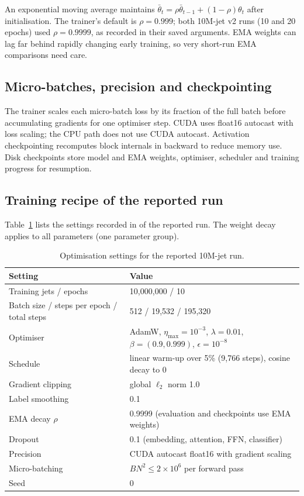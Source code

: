 \documentclass[11pt,a4paper]{article}
\newcommand{\code}[1]{\texttt{\small\detokenize{#1}}}
\numberwithin{equation}{section}
\begin{document}
An exponential moving average maintains
$\bar\theta_t=\rho\bar\theta_{t-1}+(1-\rho)\theta_t$ after initialisation.
The trainer's default is $\rho=0.999$; both 10M-jet v2 runs (10 and 20 epochs) used
$\rho=0.9999$, as recorded in their saved arguments. EMA weights can lag far behind rapidly
changing early training, so very short-run EMA comparisons need care.

\subsection{Micro-batches, precision and checkpointing}
The trainer scales each micro-batch loss by its fraction of the full
batch before accumulating gradients for one optimiser step. CUDA uses
float16 autocast with loss scaling; the CPU path does not use CUDA
autocast. Activation checkpointing recomputes block internals in
backward to reduce memory use. Disk checkpoints store model and EMA
weights, optimiser, scheduler and training progress for resumption.

\subsection{Training recipe of the reported run}
Table~\ref{tab:hyper} lists the settings recorded in \code{results.json} of the reported run.
The weight decay applies to all parameters (one parameter group).
\begin{table}[ht]
\centering\small
\begin{tabular}{p{50mm}p{95mm}}
\toprule Setting & Value\\ \midrule
Training jets / epochs & 10,000,000 / 10 \\
Batch size / steps per epoch / total steps & 512 / 19,532 / 195,320\\
Optimiser & AdamW, $\eta_{\max}=10^{-3}$, $\lambda=0.01$, $\beta=(0.9,0.999)$, $\epsilon=10^{-8}$\\
Schedule & linear warm-up over 5\% (9,766 steps), cosine decay to 0\\
Gradient clipping & global $\ell_2$ norm 1.0\\
Label smoothing & 0.1\\
EMA decay $\rho$ & 0.9999 (evaluation and checkpoints use EMA weights)\\
Dropout & 0.1 (embedding, attention, FFN, classifier)\\
Precision & CUDA autocast float16 with gradient scaling\\
Micro-batching & $BN^2\le2\times10^6$ per forward pass\\
Seed & 0\\
\bottomrule
\end{tabular}
\caption{Optimisation settings for the reported 10M-jet run.}
\label{tab:hyper}
\end{table}
\end{document}
